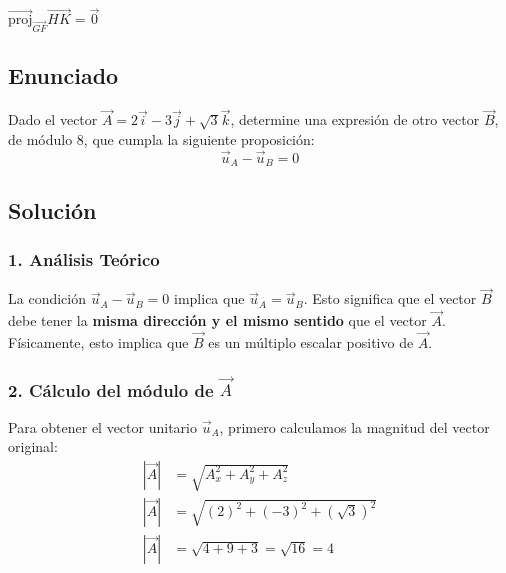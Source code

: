 \documentclass[12pt, a4paper]{article}
\begin{document}
\begin{tcolorbox}[colback=green!5, colframe=green!50!black, title=Respuesta Final]
\centering \Large $\vec{\text{proj}}_{\vec{GF}} \vec{HK} = \vec{0}$
\end{tcolorbox}

\newpage

\subsection*{Enunciado}
Dado el vector $\vec{A} = 2\vec{i} - 3\vec{j} + \sqrt{3} \vec{k}$, determine una expresión de otro vector $\vec{B}$, de módulo $8$, que cumpla la siguiente proposición:
\begin{equation*}
    \vec{u}_A - \vec{u}_B = 0
\end{equation*}

\begin{center}
\end{center}

\subsection*{Solución}

\subsubsection*{1. Análisis Teórico}
La condición $\vec{u}_A - \vec{u}_B = 0$ implica que $\vec{u}_A = \vec{u}_B$. Esto significa que el vector $\vec{B}$ debe tener la \textbf{misma dirección y el mismo sentido} que el vector $\vec{A}$. Físicamente, esto implica que $\vec{B}$ es un múltiplo escalar positivo de $\vec{A}$.

\subsubsection*{2. Cálculo del módulo de $\vec{A}$}
Para obtener el vector unitario $\vec{u}_A$, primero calculamos la magnitud del vector original:
\begin{align*}
    |\vec{A}| &= \sqrt{A_x^2 + A_y^2 + A_z^2} \\
    |\vec{A}| &= \sqrt{(2)^2 + (-3)^2 + (\sqrt{3})^2} \\
    |\vec{A}| &= \sqrt{4 + 9 + 3} = \sqrt{16} = 4
\end{align*}
\end{document}
